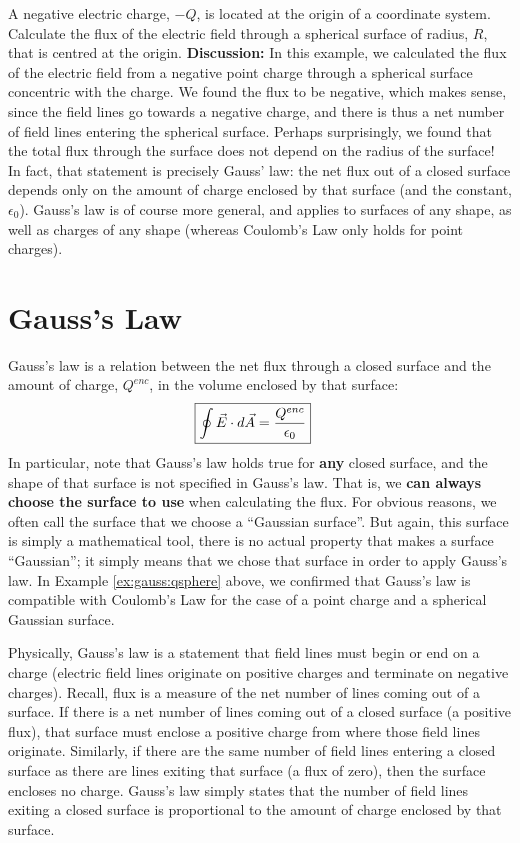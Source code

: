 \begin{example}{A negative electric charge, $-Q$, is located at the origin of a coordinate system. Calculate the flux of the electric field through a spherical surface of radius, $R$, that is centred at the origin.}
\textbf{Discussion: }In this example, we calculated the flux of the electric field from a negative point charge through a spherical surface concentric with the charge. We found the flux to be negative, which makes sense, since the field lines go towards a negative charge, and there is thus a net number of field lines entering the spherical surface. Perhaps surprisingly, we found that the total flux through the surface does not depend on the radius of the surface! In fact, that statement is precisely Gauss' law: the net flux out of a closed surface depends only on the amount of charge enclosed by that surface (and the constant, $\epsilon_0$). Gauss's law is of course more general, and applies to surfaces of any shape, as well as charges of any shape (whereas Coulomb's Law only holds for point charges). 
\end{example}

\newpage
\section{Gauss's Law}
Gauss's law is a relation between the net flux through a closed surface and the amount of charge, $Q^{enc}$, in the volume enclosed by that surface:
\begin{align*}
\Aboxed{\oint \vec E\cdot d\vec A=\frac{Q^{enc}}{\epsilon_0}}
\end{align*}
In particular, note that Gauss's law holds true for \textbf{any} closed surface, and the shape of that surface is not specified in Gauss's law.  That is, we \textbf{can always choose the surface to use} when calculating the flux. For obvious reasons, we often call the surface that we choose a ``Gaussian surface''. But again, this surface is simply a mathematical tool, there is no actual property that makes a surface ``Gaussian''; it simply means that we chose that surface in order to apply Gauss's law.  In Example \ref{ex:gauss:qsphere} above, we confirmed that Gauss's law is compatible with Coulomb's Law for the case of a point charge and a spherical Gaussian surface. 

Physically, Gauss's law is a statement that field lines must begin or end on a charge (electric field lines originate on positive charges and terminate on negative charges). Recall, flux is a measure of the net number of lines coming out of a surface. If there is a net number of lines coming out of a closed surface (a positive flux), that surface must enclose a positive charge from where those field lines originate. Similarly, if there are the same number of field lines entering a closed surface as there are lines exiting that surface (a flux of zero), then the surface encloses no charge. Gauss's law simply states that the number of field lines exiting a closed surface is proportional to the amount of charge enclosed by that surface.


